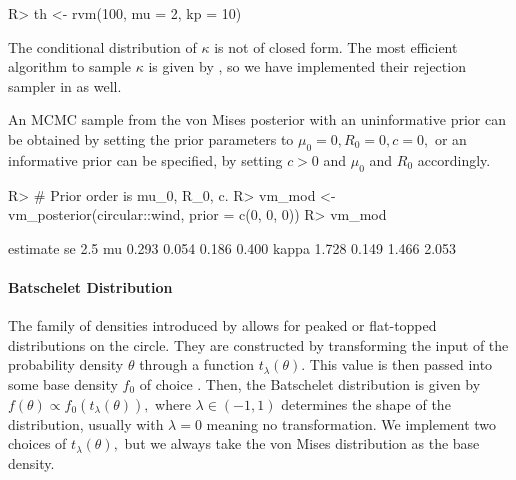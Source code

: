 \begin{CodeChunk}

\begin{CodeInput}
R> th <- rvm(100, mu = 2, kp = 10)
\end{CodeInput}
\end{CodeChunk}

The conditional distribution of \(\kappa\) is not of closed form. The
most efficient algorithm to sample \(\kappa\) is given by
\citet{forbes2015fast}, so we have implemented their rejection sampler
in  as well.

An MCMC sample from the von Mises posterior with an uninformative prior
can be obtained by setting the prior parameters to
\(\mu_0 = 0, R_0 = 0, c = 0,\) or an informative prior can be specified,
by setting \(c > 0\) and \(\mu_0\) and \(R_0\) accordingly.

\begin{CodeChunk}

\begin{CodeInput}
R> # Prior order is mu_0, R_0, c.
R> vm_mod <- vm_posterior(circular::wind, prior = c(0, 0, 0))
R> vm_mod
\end{CodeInput}

\begin{CodeOutput}
      estimate    se  2.5%
mu       0.293 0.054 0.186 0.400
kappa    1.728 0.149 1.466 2.053
\end{CodeOutput}
\end{CodeChunk}

\hypertarget{batschelet-distribution}{%
\paragraph{Batschelet Distribution}\label{batschelet-distribution}}

The family of densities introduced by \citet{batschelet1981circular}
allows for peaked or flat-topped distributions on the circle. They are
constructed by transforming the input of the probability density
\(\theta\) through a function \(t_{\lambda}(\theta).\) This value is
then passed into some base density \(f_0\) of choice
\citep{abe2010symmetric, pewsey2011extension}. Then, the Batschelet
distribution is given by \(f(\theta) \propto f_0(t_\lambda(\theta)),\)
where \(\lambda \in (-1, 1)\) determines the shape of the distribution,
usually with \(\lambda = 0\) meaning no transformation. We implement two
choices of \(t_{\lambda}(\theta),\) but we always take the von Mises
distribution as the base density.

